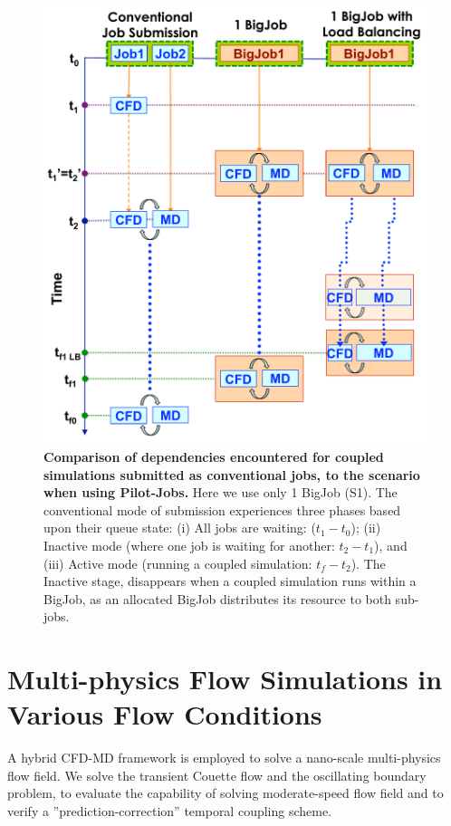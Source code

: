 \documentclass[preprint,12pt]{elsarticle}
\begin{document}
\begin{figure}
\centering
\includegraphics[width=0.8\linewidth]{Single_BigJob_Scenarios_new.pdf}
\caption{\small {\bf Comparison of dependencies encountered for coupled
  simulations submitted as conventional jobs, to the scenario when
  using Pilot-Jobs.} Here we use only 1 BigJob (S1). The conventional
  mode of submission experiences three phases based upon their queue
  state: (i) All jobs are waiting: ($t_1-t_0$); (ii) Inactive mode
  (where one job is waiting for another: $t_2-t_1$), and (iii) Active
  mode (running a coupled simulation: $t_f-t_2$). The Inactive stage,
  disappears when a coupled simulation runs within a BigJob, as an
  allocated BigJob distributes its resource to both sub-jobs.}
\label{Fig:OneBJ_Flow}
\vspace{-1em}
\end{figure}



\section{Multi-physics Flow Simulations in Various Flow Conditions}
\label{sec:accuracy}
A hybrid CFD-MD framework is employed to solve a nano-scale multi-physics flow field. We solve the transient Couette flow and the oscillating boundary problem, to evaluate the capability of solving moderate-speed flow field and to verify a ''prediction-correction''  temporal coupling scheme. 
\end{document}
